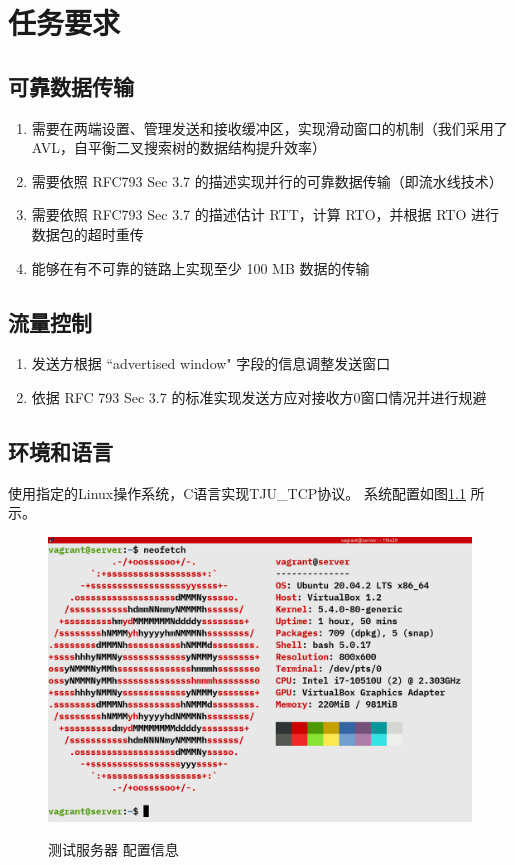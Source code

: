 \chapter{任务要求}

\section{可靠数据传输}

\begin{enumerate}
  \item 需要在两端设置、管理发送和接收缓冲区，实现滑动窗口的机制（我们采用了 AVL，自平衡二叉搜索树的数据结构提升效率）
  \item 需要依照 RFC793 Sec 3.7 的描述实现并行的可靠数据传输（即流水线技术）
  \item 需要依照 RFC793 Sec 3.7 的描述估计 RTT，计算 RTO，并根据 RTO 进行数据包的超时重传
  \item 能够在有不可靠的链路上实现至少 100 MB 数据的传输
\end{enumerate}

\section{流量控制}
\begin{enumerate}
  \item 发送方根据 “advertised window" 字段的信息调整发送窗口
  \item 依据 RFC 793 Sec 3.7 的标准实现发送方应对接收方0窗口情况并进行规避
\end{enumerate}

\section{环境和语言}

使用指定的Linux操作系统，C语言实现TJU\_TCP协议。 系统配置如图\ref{fig:ubuntu} 所示。

\begin{figure}[!htbp]
    \centering
    \includegraphics[width=.8\textwidth]{figures/_ubuntu.png}
    \label{fig:ubuntu}\caption{测试服务器 配置信息}
  \end{figure}
  
  